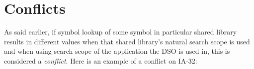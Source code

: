 \documentclass[twoside]{article}
\def\tts#1{\texttt{\small #1}}
\begin{document}

\section{Conflicts}

As said earlier, if symbol lookup of some symbol in particular shared
library results in different values when that shared library's natural
search scope is used and when using search scope of the application the
DSO is used in, this is considered a {\sl conflict}.
Here is an example of a conflict on IA-32:
\end{document}

